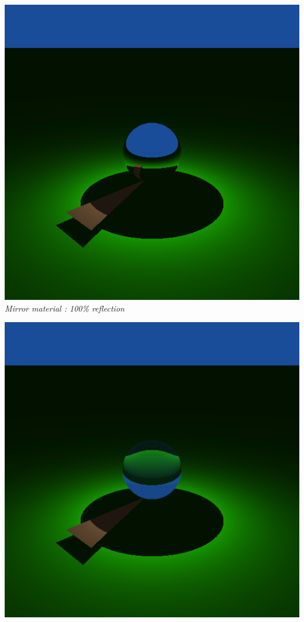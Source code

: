 \documentclass[a4,12pt]{article}
\begin{document}
	
	\begin{center}
		\begin{minipage}[b]{0.40\linewidth}
			\begin{center}
				\includegraphics[width =\textwidth]{./Worksheet2/mirror_ball.png}\\
				\textit{Mirror material : 100\% reflection\vspace{1em}}
			\end{center}
		\end{minipage}
		\hspace{0.05\linewidth}
		\begin{minipage}[b]{0.40\linewidth}
			\begin{center}
				\includegraphics[width =\textwidth]{./Worksheet2/transparent_ball.png}\\

\end{center}
\end{minipage}
\end{center}
\end{document}

